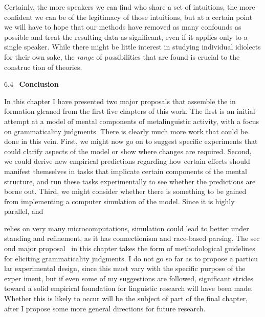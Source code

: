 \begin{styleTextbody}
Certainly, the more speakers we can find who share a set of intuitions, the more confident we can be of the legitimacy of those intuitions, but at a certain point we will have to hope that our methods have removed as many confounds as possible and treat the resulting data as significant, even if it applies only to a single speaker. While there might be little interest in studying individual idiolects for their own sake, the \textit{range}\textit{ }of possibilities that are found is crucial to the construc\- tion of theories.
\end{styleTextbody}


\begin{styleStandard}
6.4 \ \textbf{Conclusion}
\end{styleStandard}


\begin{styleTextbody}
In this chapter I have presented two major proposals that assemble the in\- formation gleaned from the first five chapters of this work. The first is an initial attempt at a model of mental components of metalinguistic activity, with a focus on grammaticality judgments. There is clearly much more work that could be done in this vein. First, we might now go on to suggest specific experiments that could clarify aspects of the model or show where changes are required. Second, we could derive new empirical predictions regarding how certain effects should manifest themselves in tasks that implicate certain components of the mental structure, and run these tasks experimentally to see whether the predictions are borne out. Third, we might consider whether there is something to be gained from implementing a computer simulation of the model. Since it is highly parallel, and
\end{styleTextbody}


\clearpage\setcounter{page}{1}\begin{styleStandard}
relies on very many microcomputations, simulation could lead to better under\- standing and refinement, as it has connectionism and race-based parsing. The sec\- ond major proposal \ in this chapter takes the form of methodological guidelines for eliciting grammaticality judgments. I do not go so far as to propose a particu\- lar experimental design, since this must vary with the specific purpose of the exper\- iment, but if even some of my suggestions are followed, significant strides toward a solid empirical foundation for linguistic research will have been made. Whether this is likely to occur will be the subject of part of the final chapter, after I propose some more general directions for future research.
\end{styleStandard}



